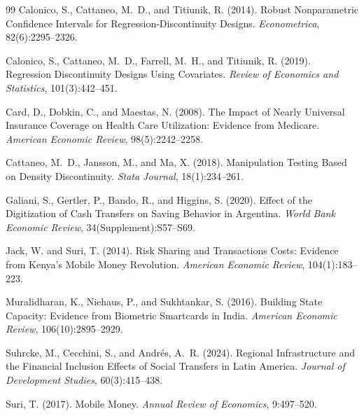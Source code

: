 \documentclass[12pt]{article}
\begin{document}
\begin{thebibliography}{99}
Calonico, S., Cattaneo, M.~D., and Titiunik, R. (2014).
Robust Nonparametric Confidence Intervals for Regression-Discontinuity
Designs.
\textit{Econometrica}, 82(6):2295--2326.

Calonico, S., Cattaneo, M.~D., Farrell, M.~H., and Titiunik, R. (2019).
Regression Discontinuity Designs Using Covariates.
\textit{Review of Economics and Statistics}, 101(3):442--451.

Card, D., Dobkin, C., and Maestas, N. (2008).
The Impact of Nearly Universal Insurance Coverage on Health Care
Utilization: Evidence from Medicare.
\textit{American Economic Review}, 98(5):2242--2258.

Cattaneo, M.~D., Jansson, M., and Ma, X. (2018).
Manipulation Testing Based on Density Discontinuity.
\textit{Stata Journal}, 18(1):234--261.

Galiani, S., Gertler, P., Bando, R., and Higgins, S. (2020).
Effect of the Digitization of Cash Transfers on Saving Behavior in
Argentina.
\textit{World Bank Economic Review}, 34(Supplement):S57--S69.

Jack, W. and Suri, T. (2014).
Risk Sharing and Transactions Costs: Evidence from Kenya's Mobile Money
Revolution.
\textit{American Economic Review}, 104(1):183--223.

Muralidharan, K., Niehaus, P., and Sukhtankar, S. (2016).
Building State Capacity: Evidence from Biometric Smartcards in India.
\textit{American Economic Review}, 106(10):2895--2929.

Suhrcke, M., Cecchini, S., and Andr\'es, A.~R. (2024).
Regional Infrastructure and the Financial Inclusion Effects of Social
Transfers in Latin America.
\textit{Journal of Development Studies}, 60(3):415--438.

Suri, T. (2017).
Mobile Money.
\textit{Annual Review of Economics}, 9:497--520.

\end{thebibliography}
\end{document}
